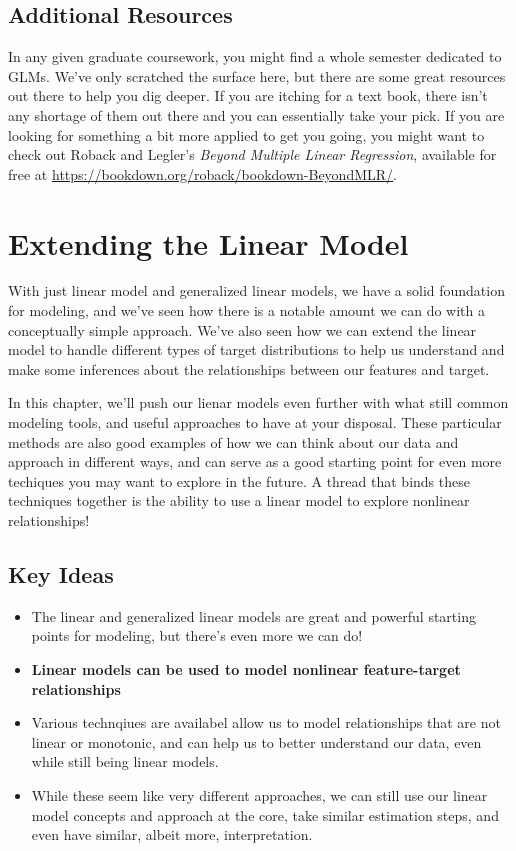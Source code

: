 \documentclass[
  letterpaper,
]{krantz}
\providecommand{\tightlist}{%
  \setlength{\itemsep}{0pt}\setlength{\parskip}{0pt}}\usepackage{longtable,booktabs,array}
\begin{document}
\section{Additional Resources}\label{sec-glm-resources}

In any given graduate coursework, you might find a whole semester
dedicated to GLMs. We've only scratched the surface here, but there are
some great resources out there to help you dig deeper. If you are
itching for a text book, there isn't any shortage of them out there and
you can essentially take your pick. If you are looking for something a
bit more applied to get you going, you might want to check out Roback
and Legler's \emph{Beyond Multiple Linear Regression}, available for
free at \url{https://bookdown.org/roback/bookdown-BeyondMLR/}.

\chapter{Extending the Linear Model}\label{sec-lm-extend}

With just linear model and generalized linear models, we have a solid
foundation for modeling, and we've seen how there is a notable amount we
can do with a conceptually simple approach. We've also seen how we can
extend the linear model to handle different types of target
distributions to help us understand and make some inferences about the
relationships between our features and target.

In this chapter, we'll push our lienar models even further with what
still common modeling tools, and useful approaches to have at your
disposal. These particular methods are also good examples of how we can
think about our data and approach in different ways, and can serve as a
good starting point for even more techiques you may want to explore in
the future. A thread that binds these techniques together is the ability
to use a linear model to explore nonlinear relationships!

\section{Key Ideas}\label{sec-lm-extend-key-ideas}

\begin{itemize}
\tightlist
\item
  The linear and generalized linear models are great and powerful
  starting points for modeling, but there's even more we can do!
\item
  \textbf{Linear models can be used to model nonlinear feature-target
  relationships}
\item
  Various technqiues are availabel allow us to model relationships that
  are not linear or monotonic, and can help us to better understand our
  data, even while still being linear models.
\item
  While these seem like very different approaches, we can still use our
  linear model concepts and approach at the core, take similar
  estimation steps, and even have similar, albeit more, interpretation.
\end{itemize}
\end{document}
